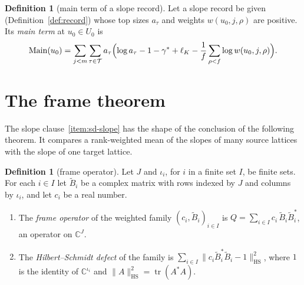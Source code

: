 \documentclass[11pt]{amsbook}
\theoremstyle{plain}
\theoremstyle{definition}
\newtheorem{definition}[theorem]{Definition}
\theoremstyle{remark}
\numberwithin{equation}{section}
\numberwithin{figure}{chapter}
\numberwithin{table}{chapter}
\renewcommand{\C}{\mathbb{C}}
\newcommand{\Top}{\mathcal{T}}
\newcommand{\Main}{\operatorname{Main}}
\begin{document}
\begin{definition}[main term of a slope record]\label{def:record-main}
Let a slope record be given (Definition~\ref{def:record}) whose top
sizes $a_\tau$ and weights $w(u_0,j,\rho)$ are positive. Its
\emph{main term} at $u_0\in U_0$ is
\[
\Main(u_0)=\sum_{j<m}\sum_{\tau\in\Top}a_\tau\Bigl(\log a_\tau
-1-\gamma^*+\ell_K-\frac1f\sum_{\rho<f}\log w(u_0,j,\rho)\Bigr).
\]
\end{definition}

\section{The frame theorem}

The slope clause~\ref{item:sd-slope} has the shape of the conclusion of the
following
theorem. It compares a rank-weighted mean of the slopes of many source
lattices with the slope of one target lattice.

\begin{definition}[frame operator]\label{def:frame-operator}
Let $J$ and $\iota_i$, for $i$ in a finite set $I$, be finite sets.
For each $i\in I$ let $\widetilde B_i$ be a complex matrix with rows
indexed by $J$ and columns by $\iota_i$, and let $c_i$ be a real
number.
\begin{enumerate}[label=(\arabic*)]
\item The \emph{frame operator} of the weighted family
$(c_i,\widetilde B_i)_{i\in I}$ is $Q=\sum_{i\in I}c_i\,\widetilde
B_i\widetilde B_i^*$, an operator on $\C^J$.
\item The \emph{Hilbert--Schmidt defect} of the family is
$\sum_{i\in I}\|c_i\widetilde B_i^*\widetilde B_i-1\|_{\mathrm{HS}}^2$,
where $1$ is the identity of $\C^{\iota_i}$ and
$\|A\|_{\mathrm{HS}}^2=\operatorname{tr}(A^*A)$.
\end{enumerate}
\end{definition}
\end{document}
